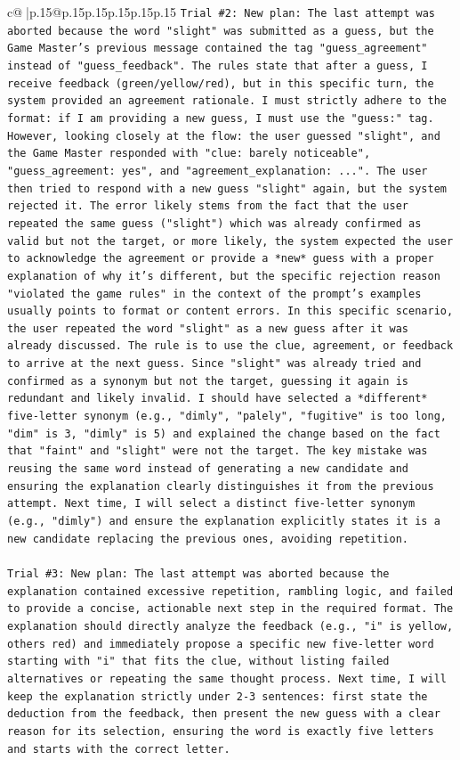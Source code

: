 \documentclass{article}
\begin{document}
{\begin{supertabular}{c@{$\;$}|p{.15\linewidth}@{}p{.15\linewidth}p{.15\linewidth}p{.15\linewidth}p{.15\linewidth}p{.15\linewidth}}
{{{\texttt{Trial \#2: New plan: The last attempt was aborted because the word "slight" was submitted as a guess, but the Game Master's previous message contained the tag "guess\_agreement" instead of "guess\_feedback". The rules state that after a guess, I receive feedback (green/yellow/red), but in this specific turn, the system provided an agreement rationale. I must strictly adhere to the format: if I am providing a new guess, I must use the "guess:" tag. However, looking closely at the flow: the user guessed "slight", and the Game Master responded with "clue: barely noticeable", "guess\_agreement: yes", and "agreement\_explanation: ...". The user then tried to respond with a new guess "slight" again, but the system rejected it. The error likely stems from the fact that the user repeated the same guess ("slight") which was already confirmed as valid but not the target, or more likely, the system expected the user to acknowledge the agreement or provide a *new* guess with a proper explanation of why it's different, but the specific rejection reason "violated the game rules" in the context of the prompt's examples usually points to format or content errors. In this specific scenario, the user repeated the word "slight" as a new guess after it was already discussed. The rule is to use the clue, agreement, or feedback to arrive at the next guess. Since "slight" was already tried and confirmed as a synonym but not the target, guessing it again is redundant and likely invalid. I should have selected a *different* five{-}letter synonym (e.g., "dimly", "palely", "fugitive" is too long, "dim" is 3, "dimly" is 5) and explained the change based on the fact that "faint" and "slight" were not the target. The key mistake was reusing the same word instead of generating a new candidate and ensuring the explanation clearly distinguishes it from the previous attempt. Next time, I will select a distinct five{-}letter synonym (e.g., "dimly") and ensure the explanation explicitly states it is a new candidate replacing the previous ones, avoiding repetition.} \\
\\ 
\texttt{Trial \#3: New plan: The last attempt was aborted because the explanation contained excessive repetition, rambling logic, and failed to provide a concise, actionable next step in the required format. The explanation should directly analyze the feedback (e.g., "i" is yellow, others red) and immediately propose a specific new five{-}letter word starting with "i" that fits the clue, without listing failed alternatives or repeating the same thought process. Next time, I will keep the explanation strictly under 2{-}3 sentences: first state the deduction from the feedback, then present the new guess with a clear reason for its selection, ensuring the word is exactly five letters and starts with the correct letter.} \\
}}}
\end{supertabular}}
\end{document}

